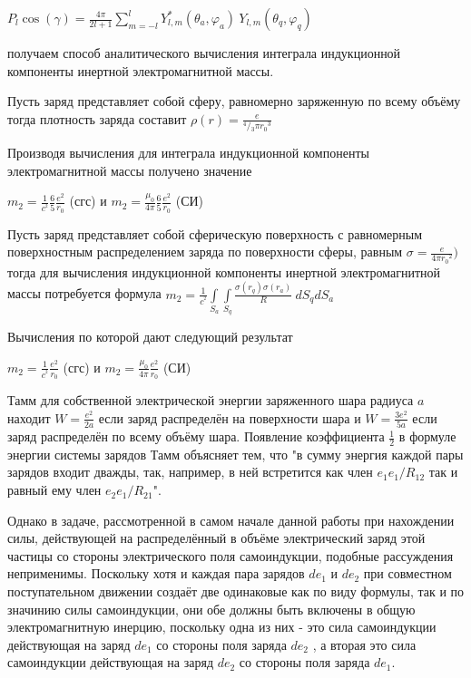 \documentclass{article}
\begin{document}
${{P}_{l}}\cos \left( \gamma  \right)=\frac{4\pi }{2l+1}\sum\limits_{m=-l}^{l}{Y_{l,m}^{*}\left( {{\theta }_{a}},{{\varphi }_{a}} \right)}\ {{Y}_{l,m}}\left( {{\theta }_{q}},{{\varphi }_{q}} \right)$

получаем способ аналитического вычисления интеграла индукционной компоненты инертной электромагнитной массы.

Пусть заряд представляет собой сферу, равномерно заряженную по всему объёму тогда плотность заряда составит $\rho \left( r \right)=\frac{e}{{}^{4}/{}_{3}\pi {{r}_{0}}^{3}}$

Производя вычисления для интеграла индукционной компоненты электромагнитной массы получено значение

$m_2 =\frac{1}{{{c}^{^{2}}}}\frac{6}{5}\frac{e^2}{{{r}_{0}}}$ (сгс) и
$m_2 =\frac{{{\mu }_{0}}}{4\pi }\frac{6}{5}\frac{e^2}{{{r}_{0}}}$ (СИ)

Пусть заряд представляет собой сферическую поверхность с равномерным поверхностным распределением заряда по поверхности сферы, равным $\sigma=\frac{e}{4\pi {{r}_{0}}^{2}})$ тогда для вычисления индукционной компоненты инертной электромагнитной массы потребуется формула
$m_2=\frac{1}{{{c}^{^{2}}}}\int\limits_{{{S}_{a}}}{\int\limits_{{{S}_{q}}}{\frac{\sigma \left( {{r}_{q}} \right)\sigma \left( {{r}_{a}} \right)}{R}}}\ d{{S}_{q}}d{{S}_{a}}$

Вычисления по которой дают следующий результат

$m_2 =\frac{1}{{{c}^{^{2}}}}\frac{e^2}{{{r}_{0}}}$ (сгс) и
$m_2 =\frac{{{\mu }_{0}}}{4\pi }\frac{e^2}{{{r}_{0}}}$ (СИ)


Тамм \cite{tamm} для собственной электрической энергии заряженного шара радиуса $a$ находит $W=\frac{e^2}{2a}$ если заряд распределён на поверхности шара и $W=\frac{3e^2}{5a}$ если заряд распределён по всему объёму шара. Появление коэффициента $\frac{1}{2}$  в формуле энергии системы зарядов Тамм объясняет тем, что "в сумму энергия каждой пары зарядов входит дважды, так, например, в ней встретится как член ${e_{1}}{e_{1}}/{R_{12}}$ так и равный ему член ${e_{2}}{e_{1}}/{R_{21}}$".

Однако в задаче, рассмотренной в самом начале данной работы при нахождении силы, действующей на распределённый в объёме электрический заряд этой частицы со стороны электрического поля самоиндукции, подобные рассуждения неприменимы. Поскольку хотя и каждая пара зарядов $d{e}_{1}$ и $d{e}_{2}$ при совместном поступательном движении создаёт две одинаковые как по виду формулы, так и по значинию силы самоиндукции, они обе должны быть включены в общую электромагнитную инерцию, поскольку одна из них - это сила самоиндукции действующая на заряд $d{e}_{1}$  со стороны поля заряда $d{e}_{2}$ , а вторая это сила самоиндукции действующая на заряд $d{e}_{2}$  со стороны поля заряда $d{e}_{1}$.
\end{document}
